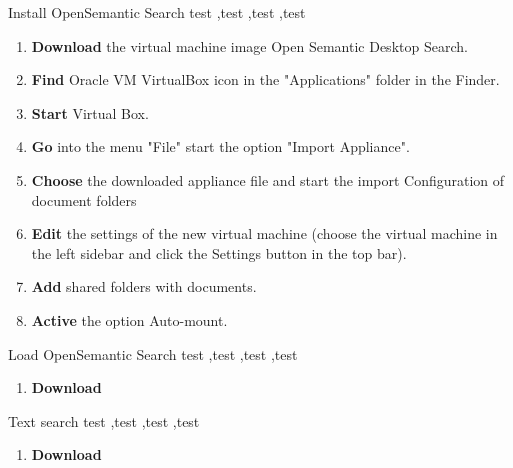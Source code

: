 \documentclass[10pt,a4paper]{article}
\begin{document}
\begin{textbox}{Install OpenSemantic Search}
test  \sep test \sep test \sep test

\bigskip

\begin{enumerate}
\item \textbf{Download} the virtual machine image Open Semantic Desktop Search. 
\item \textbf {Find} Oracle VM VirtualBox icon in the "Applications" folder in the Finder.
\item \textbf{Start} Virtual Box.
\item \textbf{Go} into the menu "File" start the option "Import Appliance".
\item \textbf{Choose} the downloaded appliance file and start the import Configuration of document folders
\item \textbf{Edit} the settings of the new virtual machine (choose the virtual machine in the left sidebar and click the Settings button in the top bar).
\item \textbf{Add} shared folders with documents.
\item \textbf{Active} the option Auto-mount.
\end{enumerate}

\end{textbox}

\begin{textbox}{Load OpenSemantic Search}
test  \sep test \sep test \sep test

\bigskip

\begin{enumerate}
\item \textbf{Download} 
\end{enumerate}

\end{textbox}

\begin{textbox}{Text search}
test  \sep test \sep test \sep test

\bigskip

\begin{enumerate}
\item \textbf{Download} 
\end{enumerate}

\end{textbox}
\end{document}
